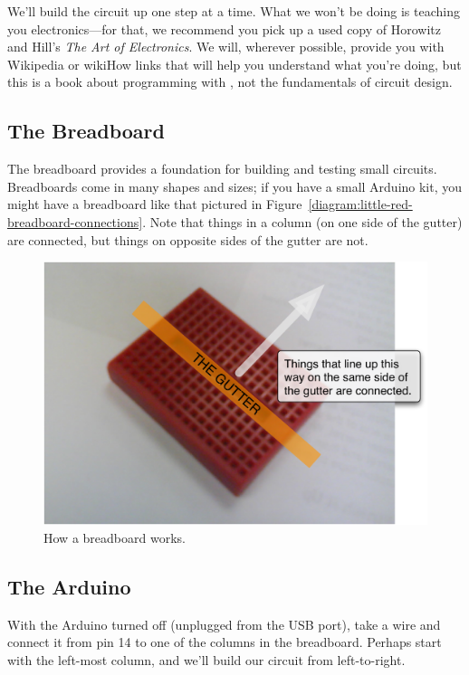 We'll build the circuit up one step at a time. What we won't be doing is teaching you electronics---for that, we recommend you pick up a used copy of Horowitz and Hill's {\em The Art of Electronics}. We will, wherever possible, provide you with Wikipedia or wikiHow links that will help you understand what you're doing, but this is a book about programming with \plumbing, not the fundamentals of circuit design.

\subsection{The Breadboard}
The breadboard provides a foundation for building and testing small circuits. Breadboards come in many shapes and sizes; if you have a small Arduino kit, you might have a breadboard like that pictured in Figure~\vref{diagram:little-red-breadboard-connections}. Note that things in a column (on one side of the gutter) are connected, but things on opposite sides of the gutter are not. 

\begin{figure}[h]
  \begin{center}
    \includegraphics[width=0.8\linewidth]{images/ch2-little-red-breadboard-connections}
    \caption{How a breadboard works.}
    \label{diagram:ch2-little-red-breadboard-connections}
  \end{center}
\end{figure}

\subsection{The Arduino}
With the Arduino turned off (unplugged from the USB port), take a wire and connect it from pin 14 to one of the columns in the breadboard. Perhaps start with the left-most column, and we'll build our circuit from left-to-right.

